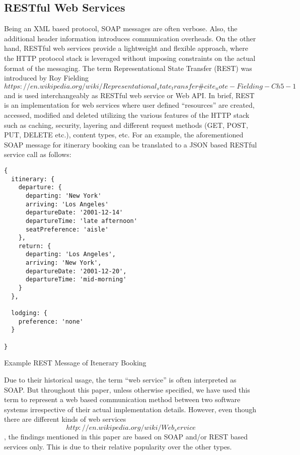 \documentclass[runningheads,a4paper]{llncs}
\begin{document}
\subsection{RESTful Web Services} %
\label{sub:restful_web_services}
Being an XML based protocol, SOAP messages are often verbose. Also, the additional header information introduces communication overheads. On the other hand, RESTful web services provide a lightweight and flexible approach, where the HTTP protocol stack is leveraged without imposing constraints on the actual format of the messaging. The term Representational State Transfer (REST) was introduced by Roy Fielding \[https://en.wikipedia.org/wiki/Representational_state_transfer\#cite_note-Fielding-Ch5-1\] and is used interchangeably as RESTful web service or Web API. In brief, REST is an implementation for web services where user defined ``resources'' are created, accessed, modified and deleted utilizing the various features of the HTTP stack such as caching, security, layering and different request methods (GET, POST, PUT, DELETE etc.), content types, etc. For an example, the aforementioned SOAP message for itinerary booking can be translated to a JSON based RESTful service call as follows:

\lstset{language=json}
\begin{lstlisting}
{
  itinerary: {
    departure: {
      departing: 'New York'
      arriving: 'Los Angeles'
      departureDate: '2001-12-14'
      departureTime: 'late afternoon'
      seatPreference: 'aisle'
    },
    return: {
      departing: 'Los Angeles',
      arriving: 'New York',
      departureDate: '2001-12-20',
      departureTime: 'mid-morning'
    }
  },

  lodging: {
    preference: 'none'
  }

}
\end{lstlisting}


Example REST Message of Itenerary Booking

Due to their historical usage, the term ``web service'' is often interpreted as SOAP. But throughout this paper, unless otherwise specified, we have used this term to represent a web based communication method between two software systems irrespective of their actual implementation details. However, even though there are different kinds of web services \[http://en.wikipedia.org/wiki/Web_service\], the findings mentioned in this paper are based on SOAP and/or REST based services only. This is due to their relative popularity over the other types.
\end{document}
